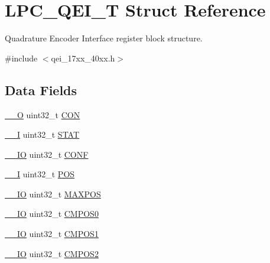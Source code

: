 \hypertarget{structLPC__QEI__T}{\section{L\-P\-C\-\_\-\-Q\-E\-I\-\_\-\-T Struct Reference}
\label{structLPC__QEI__T}
}


Quadrature Encoder Interface register block structure.  




{\ttfamily \#include $<$qei\-\_\-17xx\-\_\-40xx.\-h$>$}

\subsection*{Data Fields}
\begin{DoxyCompactItemize}
\item 
\hyperlink{core__cm3_8h_a7e25d9380f9ef903923964322e71f2f6}{\-\_\-\-\_\-\-O} uint32\-\_\-t \hyperlink{structLPC__QEI__T_af84cacebc1e4ba309cb8c1af4acca96f}{C\-O\-N}
\item 
\hyperlink{core__cm3_8h_af63697ed9952cc71e1225efe205f6cd3}{\-\_\-\-\_\-\-I} uint32\-\_\-t \hyperlink{structLPC__QEI__T_a842c67512c5c8c9a31e7ba2ec4771784}{S\-T\-A\-T}
\item 
\hyperlink{core__cm3_8h_aec43007d9998a0a0e01faede4133d6be}{\-\_\-\-\_\-\-I\-O} uint32\-\_\-t \hyperlink{structLPC__QEI__T_a72886edbac2779ab5e2823fd0db339f7}{C\-O\-N\-F}
\item 
\hyperlink{core__cm3_8h_af63697ed9952cc71e1225efe205f6cd3}{\-\_\-\-\_\-\-I} uint32\-\_\-t \hyperlink{structLPC__QEI__T_a400314449370eff087c3c5e1e1c31cc1}{P\-O\-S}
\item 
\hyperlink{core__cm3_8h_aec43007d9998a0a0e01faede4133d6be}{\-\_\-\-\_\-\-I\-O} uint32\-\_\-t \hyperlink{structLPC__QEI__T_acaf54ed95adb4553f8be314b509f786b}{M\-A\-X\-P\-O\-S}
\item 
\hyperlink{core__cm3_8h_aec43007d9998a0a0e01faede4133d6be}{\-\_\-\-\_\-\-I\-O} uint32\-\_\-t \hyperlink{structLPC__QEI__T_a4bb72cc566919075cb721bb123e72443}{C\-M\-P\-O\-S0}
\item 
\hyperlink{core__cm3_8h_aec43007d9998a0a0e01faede4133d6be}{\-\_\-\-\_\-\-I\-O} uint32\-\_\-t \hyperlink{structLPC__QEI__T_ad1272dc00c77777af8e58d6ac3b94902}{C\-M\-P\-O\-S1}
\item 
\hyperlink{core__cm3_8h_aec43007d9998a0a0e01faede4133d6be}{\-\_\-\-\_\-\-I\-O} uint32\-\_\-t \hyperlink{structLPC__QEI__T_aa2f3bddd189d57b8985ffca9ddb70ff2}{C\-M\-P\-O\-S2}

\end{DoxyCompactItemize}
